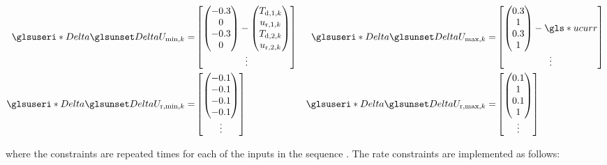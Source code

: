 \begin{align*}
  \gi{Delta} U_{\text{min},k} = &
  \begin{bmatrix} \begin{pmatrix} -0.3 \\ 0 \\ -0.3 \\ 0 \end{pmatrix} - \begin{pmatrix} T_{\text{d},1,k} \\ u_{\text{r},1,k} \\ T_{\text{d},2,k} \\ u_{\text{r},2,k} \end{pmatrix}\\ \vdots \end{bmatrix} 
  &\gi{Delta} U_{\text{max},k} = &
  \begin{bmatrix} \begin{pmatrix} 0.3 \\ 1 \\ 0.3 \\ 1 \end{pmatrix} - \g{ucurr}\\ \vdots \end{bmatrix}\\
%
  \gi{Delta} U_{\text{r,min},k} = &
  \begin{bmatrix} \begin{pmatrix}-0.1\\ -0.1\\ -0.1\\ -0.1\end{pmatrix}\\ \vdots \end{bmatrix}
  &\gi{Delta} U_{\text{r,max},k} = &
  \begin{bmatrix} \begin{pmatrix}0.1\\ 1\\ 0.1\\ 1\end{pmatrix}\\ \vdots \end{bmatrix}
\end{align*}

\noindent where the constraints are repeated  times for each of the inputs in the sequence .
The rate constraints are implemented as follows:

